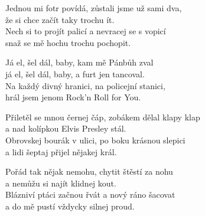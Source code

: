 
\ve{}
Jednou mi fotr povídá, zůstali jsme už sami dva,\\
že si chce začít taky trochu ít.\\
Nech si to projít palicí a nevracej se s vopicí\\
snaž se mě hochu trochu pochopit.

\cho{}
Já el, šel dál, baby, kam mě Pánbůh zval\\
já el, šel dál, baby, a furt jen tancoval.\\
Na každý divný hranici, na policejní stanici,\\
hrál jsem jenom Rock'n Roll for You.

\ve{}
Přiletěl se mnou černej čáp, zobákem dělal klapy klap\\
a nad kolípkou Elvis Presley stál.\\
Obrovskej bourák v ulici, po boku krásnou slepici\\
a lidi šeptaj přijel nějakej král.

\cho{}

\ve{}
Pořád tak nějak nemohu, chytit štěstí za nohu\\
a nemůžu si najít klidnej kout.\\
Blázniví ptáci začnou řvát a nový ráno šacovat\\
a do mě pustí vždycky silnej proud. 

\cho{}

\esong